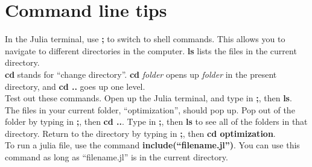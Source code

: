 \documentclass[12pt]{article}
\begin{document}
\section{Command line tips}
In the Julia terminal, use {\bf ;} to switch to shell commands.  This allows you to navigate to different directories in the computer.  {\bf ls} lists the files in the current directory.  \\

{\bf cd} stands for ``change directory''.  {\bf cd} \emph{folder} opens up \emph{folder} in the present directory, and {\bf cd ..} goes up one level. \\

Test out these commands.  Open up the Julia terminal, and type in {\bf ;}, then {\bf ls}.  The files in your current folder, ``optimization'', should pop up.  Pop out of the folder by typing in {\bf ;}, then {\bf cd ..}.  Type in {\bf ;}, then {\bf ls} to see
all of the folders in that directory.  Return to the directory by typing in {\bf ;}, then {\bf cd optimization}.\\

To run a julia file, use the command {\bf include(``filename.jl'')}.  You can use this command as long as ``filename.jl'' is in the current
directory.  
\end{document}
